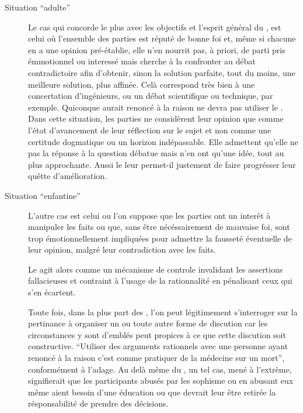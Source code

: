 \begin{description}
  \item[Situation \enquote{adulte}] Le cas qui concorde le plus avec les objectifs et l’esprit général du \mainabbr{}, est celui où l’ensemble des parties est réputé de bonne foi et, même si chacune en a une opinion pré-établie, elle n’en nourrit pas, à priori, de parti pris émmotionnel ou interessé mais cherche à la confronter au débat contradictoire afin d’obtenir, sinon la solution parfaite, tout du moins, une meilleure solution, plus affinée. Celà correspond très bien à une concertation d’ingénieurs, ou un débat scientifique ou technique, par exemple. Quiconque aurait renoncé à la raison ne devra pas utiliser le \mainabbr{}.
Dans cette situation, les parties ne considèrent leur opinion que comme l’état d’avancement de leur réflection sur le sujet et non comme une certitude dogmatique ou un horizon indépassable. Elle admettent qu’elle ne  pas la réponse à la question débatue mais n’en ont qu’une idée, tout au plus approchante. Aussi le \mainabbr{} leur permet-il justement de faire progrésser leur quêtte d’amélioration.

  \item[Situation \enquote{enfantine}] L’autre cas est celui ou l’on suppose que les parties ont un interêt à manipuler les faits ou que, sans être nécéssairement de mauvaise foi, sont trop émotionnellement impliquées pour admettre la fausseté éventuelle de leur opinion, malgré leur contradiction avec les faits.

  Le \mainabbr{} agit alors comme un mécanisme de controle invalidant les assertions fallacieuses et contraint à l’usage de la rationnalité en pénalisant ceux qui s’en écartent.

  Toute fois, dans la plus part des , l’on peut légitimement s’interroger sur la pertinance à organiser un \mainabbr{} ou toute autre forme de discution car les circonstances y sont d’emblés peut propices à ce que cette discution soit constructive. \enquote{Utiliser des arguments rationnels avec une personne ayant renoncé à la raison c’est comme pratiquer de la médecine sur un mort}, conformément à l’adage. Au delà même du \mainabbr{}, un tel cas, mené à l’extrème, signifierait que les participants abusés par les sophisme ou en abusant eux même aient besoin d’une éducation ou que devrait leur être retirée la résponsabilité de prendre des décisions.
\end{description}



